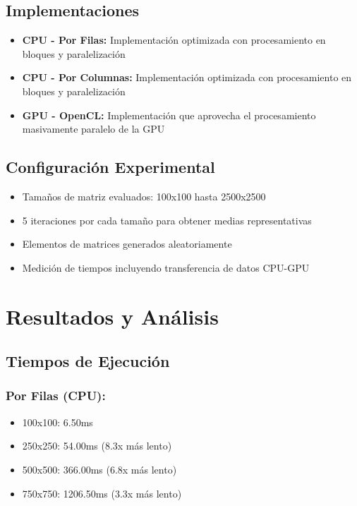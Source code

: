 \documentclass[11pt]{article}
\begin{document}
\subsection{Implementaciones}
\begin{itemize}
    \item \textbf{CPU - Por Filas:} Implementación optimizada con procesamiento en bloques y paralelización
    \item \textbf{CPU - Por Columnas:} Implementación optimizada con procesamiento en bloques y paralelización
    \item \textbf{GPU - OpenCL:} Implementación que aprovecha el procesamiento masivamente paralelo de la GPU
\end{itemize}

\subsection{Configuración Experimental}
\begin{itemize}
    \item Tamaños de matriz evaluados: 100x100 hasta 2500x2500
    \item 5 iteraciones por cada tamaño para obtener medias representativas
    \item Elementos de matrices generados aleatoriamente
    \item Medición de tiempos incluyendo transferencia de datos CPU-GPU
\end{itemize}

\section{Resultados y Análisis}
\subsection{Tiempos de Ejecución}

\subsubsection{Por Filas (CPU):}
\begin{itemize}
    \item 100x100: 6.50ms
    \item 250x250: 54.00ms (8.3x más lento)
    \item 500x500: 366.00ms (6.8x más lento)
    \item 750x750: 1206.50ms (3.3x más lento)
\end{itemize}
\end{document}
